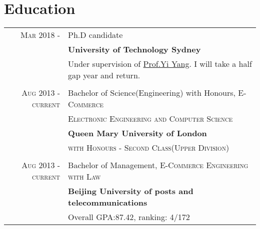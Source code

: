 \documentclass[a4paper,10pt]{article}
\begin{document}
\section{Education}
\begin{tabular}{rl}	

 \textsc{Mar 2018} - \textsc{} & Ph.D candidate\\
& \textbf{University of Technology Sydney}\\
& Under supervision of \href{https://sites.google.com/site/ianyyang2016/}{Prof.Yi Yang}. I will take a half gap year and return.\\
\\
 \textsc{Aug 2013} - \textsc{current} & Bachelor of Science(Engineering) with Honours, \textsc{E-Commerce}\\
&\textsc{Electronic Engineering and} \textsc{Computer Science}\\
& \textbf{Queen Mary University of London}\\
& \textsc{with Honours - Second Class(Upper Division)}  \\
\\

 \textsc{Aug 2013} - \textsc{current} & Bachelor of Management, \textsc{E-Commerce Engineering with Law}\\
& \textbf{Beijing University of posts and telecommunications}\\
& Overall GPA:\textsc{87.42}, ranking: \textsc{4/172}  \\

\end{tabular}

\end{document}
